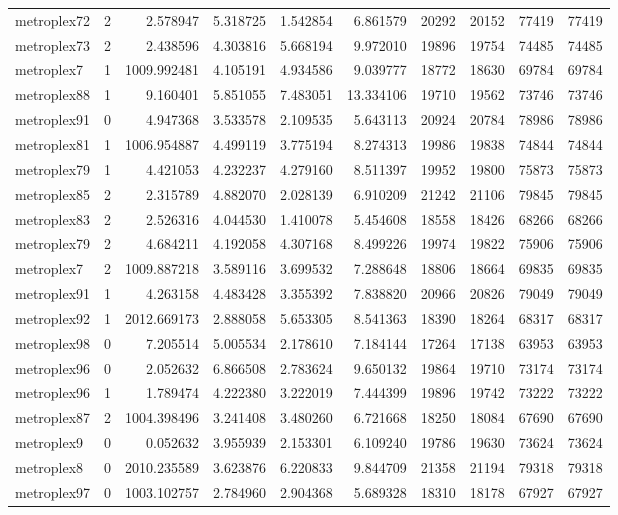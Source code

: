 \begin{longtable}{|l|r|r|r|r|r|r|r|r|r|}
metroplex72 & 2 & 2.578947 & 5.318725 & 1.542854 & 6.861579 & 20292 & 20152 & 77419 & 77419 \\
metroplex73 & 2 & 2.438596 & 4.303816 & 5.668194 & 9.972010 & 19896 & 19754 & 74485 & 74485 \\
metroplex7 & 1 & 1009.992481 & 4.105191 & 4.934586 & 9.039777 & 18772 & 18630 & 69784 & 69784 \\
metroplex88 & 1 & 9.160401 & 5.851055 & 7.483051 & 13.334106 & 19710 & 19562 & 73746 & 73746 \\
metroplex91 & 0 & 4.947368 & 3.533578 & 2.109535 & 5.643113 & 20924 & 20784 & 78986 & 78986 \\
metroplex81 & 1 & 1006.954887 & 4.499119 & 3.775194 & 8.274313 & 19986 & 19838 & 74844 & 74844 \\
metroplex79 & 1 & 4.421053 & 4.232237 & 4.279160 & 8.511397 & 19952 & 19800 & 75873 & 75873 \\
metroplex85 & 2 & 2.315789 & 4.882070 & 2.028139 & 6.910209 & 21242 & 21106 & 79845 & 79845 \\
metroplex83 & 2 & 2.526316 & 4.044530 & 1.410078 & 5.454608 & 18558 & 18426 & 68266 & 68266 \\
metroplex79 & 2 & 4.684211 & 4.192058 & 4.307168 & 8.499226 & 19974 & 19822 & 75906 & 75906 \\
metroplex7 & 2 & 1009.887218 & 3.589116 & 3.699532 & 7.288648 & 18806 & 18664 & 69835 & 69835 \\
metroplex91 & 1 & 4.263158 & 4.483428 & 3.355392 & 7.838820 & 20966 & 20826 & 79049 & 79049 \\
metroplex92 & 1 & 2012.669173 & 2.888058 & 5.653305 & 8.541363 & 18390 & 18264 & 68317 & 68317 \\
metroplex98 & 0 & 7.205514 & 5.005534 & 2.178610 & 7.184144 & 17264 & 17138 & 63953 & 63953 \\
metroplex96 & 0 & 2.052632 & 6.866508 & 2.783624 & 9.650132 & 19864 & 19710 & 73174 & 73174 \\
metroplex96 & 1 & 1.789474 & 4.222380 & 3.222019 & 7.444399 & 19896 & 19742 & 73222 & 73222 \\
metroplex87 & 2 & 1004.398496 & 3.241408 & 3.480260 & 6.721668 & 18250 & 18084 & 67690 & 67690 \\
metroplex9 & 0 & 0.052632 & 3.955939 & 2.153301 & 6.109240 & 19786 & 19630 & 73624 & 73624 \\
metroplex8 & 0 & 2010.235589 & 3.623876 & 6.220833 & 9.844709 & 21358 & 21194 & 79318 & 79318 \\
metroplex97 & 0 & 1003.102757 & 2.784960 & 2.904368 & 5.689328 & 18310 & 18178 & 67927 & 67927 \\

\end{longtable}
